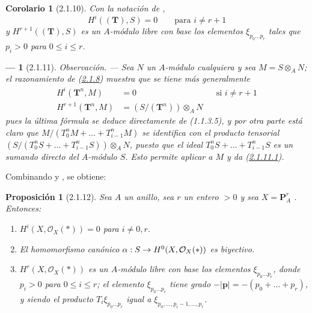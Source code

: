 \documentclass[10pt,oneside,openany]{book}
\theoremstyle{egaenv}\newtheorem*{env}{---}
\theoremstyle{egastatement}
\newtheorem*{proposition}{Proposición}
\newtheorem*{corollary}{Corolario}
\theoremstyle{egadescription}
\newcommand{\oldpage}[2][]{\marginnote{\normalfont\scriptsize\textbf{#1}\,|\,#2}\ignorespaces}
\renewcommand{\leq}{\leqslant}
\renewcommand{\to}{\mathchoice{\longrightarrow}{\rightarrow}{\rightarrow}{\rightarrow}}
\begin{document}
\begin{corollary}[2.1.10]
\label{III.2.1.10}
\label{III.2.1.10-fr}
Con la notación de ,
\begin{equation}
\label{III.2.1.10.1-fr}
\tag{2.1.10.1}
H^i((\mathbf T),S)=0\qquad\text{para }i\neq r+1
\end{equation}
y $H^{r+1}((\mathbf T),S)$ es un $A$-módulo libre con base los elementos $\xi_{p_0\ldots p_r}$ tales que $p_i>0$ para $0\leq i\leq r$.
\end{corollary}

\begin{env}[2.1.11]
\label{III.2.1.11}
\label{III.2.1.11-fr}
\emph{Observación.} ---
Sea $N$ un $A$-módulo cualquiera y sea $M=S\otimes_A N$; el razonamiento de
(\hyperref[III.2.1.8-fr]{2.1.8}) muestra que se tiene más generalmente
\begin{align}
\label{III.2.1.11.1-fr}
\tag{2.1.11.1}
H^i(\mathbf T^n,M)&=0 &&\text{si }i\neq r+1\\
\label{III.2.1.11.2-fr}
\tag{2.1.11.2}
H^{r+1}(\mathbf T^n,M)&=(S/(\mathbf T^n))\otimes_A N
\end{align}
pues la última fórmula se deduce directamente de (1.1.3.5), y por otra
parte está claro que
$M/(T_0^nM+\ldots+T_{i-1}^nM)$ se identifica con el producto tensorial $(S/(T_0^nS+\ldots+T_{i-1}^nS))\otimes_A N$,
puesto que el ideal $T_0^nS+\ldots+T_{i-1}^nS$ es un sumando directo del $A$-módulo $S$.
Esto permite aplicar  a $M$ y da (\hyperref[III.2.1.11.1]{2.1.11.1}).
\end{env}

Combinando  y , se obtiene:

\begin{proposition}[2.1.12]
\label{III.2.1.12}
\label{III.2.1.12-fr}
Sea $A$ un anillo, sea $r$ un entero $>0$ y sea $X=\mathbf P_A^r$ .
Entonces:
\begin{enumerate}
  \item[{\rm(i)}] $H^i(X,\mathcal O_X(*))=0$ para $i\neq0,r$.
  \item[{\rm(ii)}] El homomorfismo canónico $\alpha:S\to H^0(X,\mathcal O_X(*))$  es biyectivo.
\oldpage[III]{99}
  \item[{\rm(iii)}] $H^r(X,\mathcal O_X(*))$ es un $A$-módulo libre con base los elementos $\xi_{p_0\ldots p_r}$, donde $p_i>0$ para $0\leq i\leq r$; el elemento $\xi_{p_0\ldots p_r}$ tiene grado $-|\mathbf p|=-(p_0+\ldots+p_r)$, y siendo el producto
$T_i\xi_{p_0\ldots p_r}$ igual a
$\xi_{p_0,\ldots,p_i-1,\ldots,p_r}$.
\end{enumerate}
\end{proposition}
\end{document}
